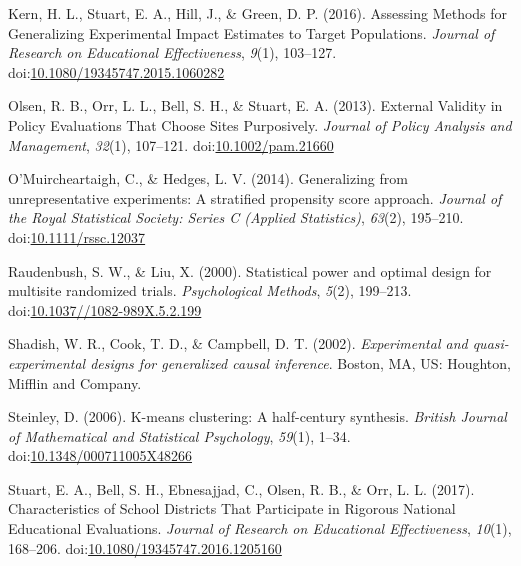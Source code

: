 \documentclass[man,floatsintext]{apa6}
\begin{document}
\leavevmode\hypertarget{ref-kernAssessingMethodsGeneralizing2016}{}%
Kern, H. L., Stuart, E. A., Hill, J., \& Green, D. P. (2016). Assessing Methods for Generalizing Experimental Impact Estimates to Target Populations. \emph{Journal of Research on Educational Effectiveness}, \emph{9}(1), 103--127. doi:\href{https://doi.org/10.1080/19345747.2015.1060282}{10.1080/19345747.2015.1060282}

\leavevmode\hypertarget{ref-olsenExternalValidityPolicy2013}{}%
Olsen, R. B., Orr, L. L., Bell, S. H., \& Stuart, E. A. (2013). External Validity in Policy Evaluations That Choose Sites Purposively. \emph{Journal of Policy Analysis and Management}, \emph{32}(1), 107--121. doi:\href{https://doi.org/10.1002/pam.21660}{10.1002/pam.21660}

\leavevmode\hypertarget{ref-omuircheartaighGeneralizingUnrepresentativeExperiments2014}{}%
O'Muircheartaigh, C., \& Hedges, L. V. (2014). Generalizing from unrepresentative experiments: A stratified propensity score approach. \emph{Journal of the Royal Statistical Society: Series C (Applied Statistics)}, \emph{63}(2), 195--210. doi:\href{https://doi.org/10.1111/rssc.12037}{10.1111/rssc.12037}

\leavevmode\hypertarget{ref-raudenbushStatisticalPowerOptimal2000}{}%
Raudenbush, S. W., \& Liu, X. (2000). Statistical power and optimal design for multisite randomized trials. \emph{Psychological Methods}, \emph{5}(2), 199--213. doi:\href{https://doi.org/10.1037//1082-989X.5.2.199}{10.1037//1082-989X.5.2.199}

\leavevmode\hypertarget{ref-shadishExperimentalQuasiexperimentalDesigns2002}{}%
Shadish, W. R., Cook, T. D., \& Campbell, D. T. (2002). \emph{Experimental and quasi-experimental designs for generalized causal inference}. Boston, MA, US: Houghton, Mifflin and Company.

\leavevmode\hypertarget{ref-steinleyKmeansClusteringHalfcentury2006}{}%
Steinley, D. (2006). K-means clustering: A half-century synthesis. \emph{British Journal of Mathematical and Statistical Psychology}, \emph{59}(1), 1--34. doi:\href{https://doi.org/10.1348/000711005X48266}{10.1348/000711005X48266}

\leavevmode\hypertarget{ref-stuartCharacteristicsSchoolDistricts2017}{}%
Stuart, E. A., Bell, S. H., Ebnesajjad, C., Olsen, R. B., \& Orr, L. L. (2017). Characteristics of School Districts That Participate in Rigorous National Educational Evaluations. \emph{Journal of Research on Educational Effectiveness}, \emph{10}(1), 168--206. doi:\href{https://doi.org/10.1080/19345747.2016.1205160}{10.1080/19345747.2016.1205160}
\end{document}
